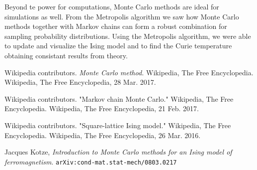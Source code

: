 \documentclass{article}
\begin{document}
Beyond te power for computations, Monte Carlo methods are ideal for simulations as well. From the Metropolis algorithm we saw how Monte
Carlo methods together with Markov chains can form a robust combination for sampling probability distributions. Using the Metropolis algorithm,
we were able to update and visualize the Ising model and to find the Curie temperature obtaining consistant results from theory.


\begin{thebibliography}{9}

    Wikipedia contributors. \emph{Monte Carlo method.} Wikipedia, The Free Encyclopedia. Wikipedia, The Free Encyclopedia, 28 Mar. 2017.

    Wikipedia contributors. "Markov chain Monte Carlo." Wikipedia, The Free Encyclopedia. Wikipedia, The Free Encyclopedia, 21 Feb. 2017.

    Wikipedia contributors. "Square-lattice Ising model." Wikipedia, The Free Encyclopedia. Wikipedia, The Free Encyclopedia, 26 Mar. 2016.

  	  Jacques Kotze,
  	  \emph{Introduction to Monte Carlo methods for an Ising model of ferromagnetism}.
      \tt{arXiv:cond-mat.stat-mech/0803.0217}

\end{thebibliography}
\end{document}
